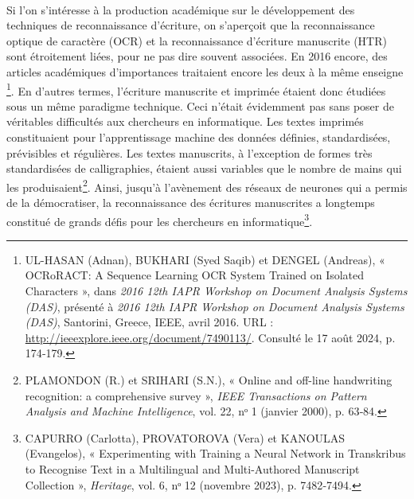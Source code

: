 \documentclass[a4paper,12pt,twoside]{book}
\begin{document}
\paragraph{}
Si l’on s’intéresse à la production académique sur le développement des techniques de reconnaissance d’écriture, on s’aperçoit que la reconnaissance optique de caractère (OCR) et la reconnaissance d’écriture manuscrite (HTR) sont étroitement liées, pour ne pas dire souvent associées. En 2016 encore, des articles académiques d’importances traitaient encore les deux à la même enseigne \footnote{\textsc{UL-HASAN} (Adnan), \textsc{BUKHARI} (Syed Saqib) et \textsc{DENGEL} (Andreas), « OCRoRACT: A Sequence Learning OCR System Trained on Isolated Characters », dans \emph{2016 12th IAPR Workshop on Document Analysis Systems (DAS)}, présenté à \emph{2016 12th IAPR Workshop on Document Analysis Systems (DAS)}, Santorini, Greece, IEEE, avril 2016. URL : \url{http://ieeexplore.ieee.org/document/7490113/}. Consulté le 17 août 2024, p. 174‑179.}. En d’autres termes, l’écriture manuscrite et imprimée étaient donc étudiées sous un même paradigme technique. Ceci n’était évidemment pas sans poser de véritables difficultés aux chercheurs en informatique. Les textes imprimés constituaient pour l’apprentissage machine des données définies, standardisées, prévisibles et régulières. Les textes manuscrits, à l’exception de formes très standardisées de calligraphies, étaient aussi variables que le nombre de mains qui les produisaient\footnote{\textsc{PLAMONDON} (R.) et \textsc{SRIHARI} (S.N.), « Online and off-line handwriting recognition: a comprehensive survey », \emph{IEEE Transactions on Pattern Analysis and Machine Intelligence}, vol. 22, nᵒ 1 (janvier 2000), p. 63‑84.}. Ainsi, jusqu’à l’avènement des réseaux de neurones qui a permis de la démocratiser, la reconnaissance des écritures manuscrites a longtemps constitué de grands défis pour les chercheurs en informatique\footnote{\textsc{CAPURRO} (Carlotta), \textsc{PROVATOROVA} (Vera) et \textsc{KANOULAS} (Evangelos), « Experimenting with Training a Neural Network in Transkribus to Recognise Text in a Multilingual and Multi-Authored Manuscript Collection », \emph{Heritage}, vol. 6, nᵒ 12 (novembre 2023), p. 7482‑7494.}.
\end{document}
